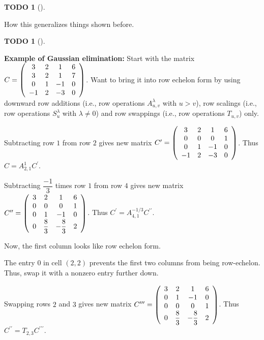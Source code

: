 \documentclass[numbers=enddot,12pt,final,onecolumn,notitlepage]{scrartcl}%
\theoremstyle{definition}
\newtheorem{quest}[theo]{TODO}
\newenvironment{todo}[1][]
{\begin{quest}[#1]\begin{leftbar}}
{\end{leftbar}\end{quest}}
\begin{document}
\begin{todo}
How this generalizes things shown before.
\end{todo}

\begin{todo}
\textbf{Example of Gaussian elimination:} Start with the matrix $C=\left(
\begin{array}
[c]{cccc}%
3 & 2 & 1 & 6\\
3 & 2 & 1 & 7\\
0 & 1 & -1 & 0\\
-1 & 2 & -3 & 0
\end{array}
\right)  $. Want to bring it into row echelon form by using downward row
additions (i.e., row operations $A_{u,v}^{\lambda}$ with $u>v$), row scalings
(i.e., row operations $S_{u}^{\lambda}$ with $\lambda\neq0$) and row swappings
(i.e., row operations $T_{u,v}$) only.

Subtracting row $1$ from row $2$ gives new matrix $C^{\prime}=\left(
\begin{array}
[c]{cccc}%
3 & 2 & 1 & 6\\
0 & 0 & 0 & 1\\
0 & 1 & -1 & 0\\
-1 & 2 & -3 & 0
\end{array}
\right)  $. Thus $C=A_{2,1}^{1}C^{\prime}$.

Subtracting $\dfrac{-1}{3}$ times row $1$ from row $4$ gives new matrix
$C^{\prime\prime}=\left(
\begin{array}
[c]{cccc}%
3 & 2 & 1 & 6\\
0 & 0 & 0 & 1\\
0 & 1 & -1 & 0\\
0 & \dfrac{8}{3} & -\dfrac{8}{3} & 2
\end{array}
\right)  $. Thus $C^{\prime}=A_{4,1}^{-1/3}C^{\prime\prime}$.

Now, the first column looks like row echelon form.

The entry $0$ in cell $\left(  2,2\right)  $ prevents the first two columns
from being row-echelon. Thus, swap it with a nonzero entry further down.

Swapping rows $2$ and $3$ gives new matrix $C^{\prime\prime\prime}=\left(
\begin{array}
[c]{cccc}%
3 & 2 & 1 & 6\\
0 & 1 & -1 & 0\\
0 & 0 & 0 & 1\\
0 & \dfrac{8}{3} & -\dfrac{8}{3} & 2
\end{array}
\right)  $. Thus $C^{\prime\prime}=T_{2,3}C^{\prime\prime\prime}$.


\end{todo}
\end{document}
